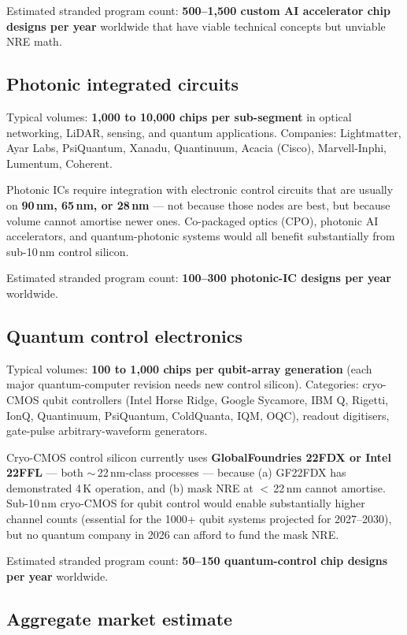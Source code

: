 \documentclass[11pt,letterpaper]{article}
\begin{document}
Estimated stranded program count: \textbf{500--1{,}500 custom AI accelerator chip designs per year} worldwide that have viable technical concepts but unviable NRE math.

\subsection{Photonic integrated circuits}

Typical volumes: \textbf{1{,}000 to 10{,}000 chips per sub-segment} in optical networking, LiDAR, sensing, and quantum applications. Companies: Lightmatter, Ayar Labs, PsiQuantum, Xanadu, Quantinuum, Acacia (Cisco), Marvell-Inphi, Lumentum, Coherent.

Photonic ICs require integration with electronic control circuits that are usually on \textbf{90\,nm, 65\,nm, or 28\,nm} --- not because those nodes are best, but because volume cannot amortise newer ones. Co-packaged optics (CPO), photonic AI accelerators, and quantum-photonic systems would all benefit substantially from sub-10\,nm control silicon.

Estimated stranded program count: \textbf{100--300 photonic-IC designs per year} worldwide.

\subsection{Quantum control electronics}

Typical volumes: \textbf{100 to 1{,}000 chips per qubit-array generation} (each major quantum-computer revision needs new control silicon). Categories: cryo-CMOS qubit controllers (Intel Horse Ridge, Google Sycamore, IBM Q, Rigetti, IonQ, Quantinuum, PsiQuantum, ColdQuanta, IQM, OQC), readout digitisers, gate-pulse arbitrary-waveform generators.

Cryo-CMOS control silicon currently uses \textbf{GlobalFoundries 22FDX or Intel 22FFL} --- both $\sim$\,22\,nm-class processes --- because (a) GF22FDX has demonstrated 4\,K operation, and (b) mask NRE at $<$\,22\,nm cannot amortise. Sub-10\,nm cryo-CMOS for qubit control would enable substantially higher channel counts (essential for the 1000+ qubit systems projected for 2027--2030), but no quantum company in 2026 can afford to fund the mask NRE.

Estimated stranded program count: \textbf{50--150 quantum-control chip designs per year} worldwide.

\subsection{Aggregate market estimate}
\end{document}
